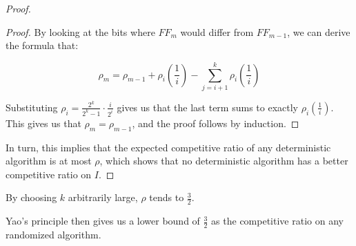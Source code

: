 \begin{proof}
\begin{proof}



By looking at the bits where $FF_m$ would differ from $FF_{m-1}$, we can derive the formula that:

\[\rho_m = \rho_{m-1} + \rho_i\left(\frac{1}{i}\right) - \sum_{j=i+1}^k \rho_i\left(\frac{1}{i}\right)\]

Substituting $\rho_i = \frac{2^k}{2^k-1}\cdot\frac{i}{2^i}$ gives us that the last term sums to exactly $\rho_i(\frac{1}{i})$.  This gives us that $\rho_m = \rho_{m-1}$, and the proof follows by induction.
\end{proof}

In turn, this implies that the expected competitive ratio of any deterministic algorithm is at most $\rho$, which shows that no deterministic algorithm has a better competitive ratio on $I$. 
\end{proof}

By choosing $k$ arbitrarily large, $\rho$ tends to $\frac{3}{2}$. 

Yao's principle then gives us a lower bound of $\frac{3}{2}$ as the competitive ratio on any randomized algorithm.

